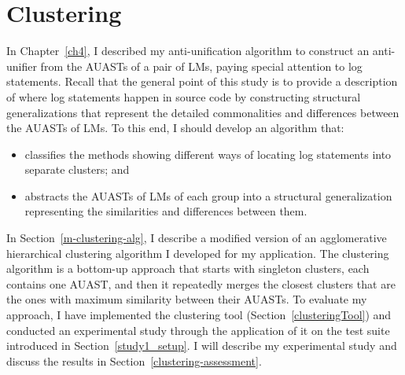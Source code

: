 \chapter{Clustering}  \label{clustering}
In Chapter~\ref{ch4}, I described my anti-unification algorithm to construct an anti-unifier from the AUASTs of a pair of LMs, paying special attention to log statements. Recall that the general point of this study is to provide a description of where log statements happen in source code by constructing structural generalizations that represent the detailed commonalities and differences between the AUASTs of LMs. To this end, I should develop an algorithm that:
\begin{itemize} [leftmargin=.5in]
\item classifies the methods showing different ways of locating log statements into separate clusters; and
\item abstracts the AUASTs of LMs of each group into a structural generalization representing the similarities and differences between them.
\end{itemize}

In Section~\ref{m-clustering-alg}, I describe a modified version of an agglomerative hierarchical clustering algorithm I developed for my application. The clustering algorithm is a bottom-up approach that starts with singleton clusters, each contains one AUAST, and then it repeatedly merges the closest clusters that are the ones with maximum similarity between their AUASTs. To evaluate my approach, I have implemented the clustering tool (Section~\ref{clusteringTool}) and conducted an experimental study through the application of it on the test suite introduced in Section~\ref{study1_setup}. I will describe my experimental study and discuss the results in Section~\ref{clustering-assessment}.



